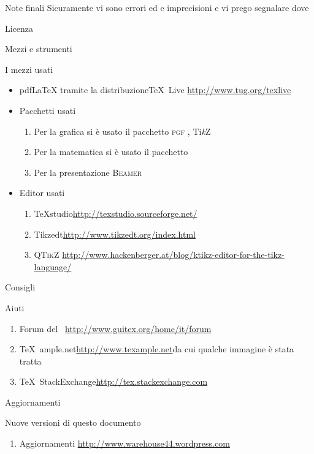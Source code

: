 \begin{frame}{Note finali}
	Sicuramente vi sono errori ed e imprecisioni e vi prego segnalare dove
	\begin{alertblock}{Licenza}
	
	\end{alertblock}
\end{frame}
\begin{frame}{Mezzi e strumenti}
	\begin{alertblock}{I mezzi usati}
		\begin{itemize}
			\item pdf\LaTeX{} tramite la distribuzione\TeX{}~Live\newline
			\url{http://www.tug.org/texlive}
			\item Pacchetti usati
			\begin{enumerate}
				\item Per la grafica si è usato il pacchetto \textsc{pgf} \pgfversion, Ti\emph{k}Z
				\item Per la matematica si è usato il pacchetto \AmS
				\item Per la presentazione \textsc{Beamer}
			\end{enumerate}
			\item Editor usati
			\begin{enumerate}
				\item \TeX{}studio\newline \url{http://texstudio.sourceforge.net/} %
				\item Tikzedt\newline \url{http://www.tikzedt.org/index.html} %
				\item \textsc{QTikZ}\newline
				\url{http://www.hackenberger.at/blog/ktikz-editor-for-the-tikz-language/}
			\end{enumerate}
		\end{itemize}
	\end{alertblock}
\end{frame}
\begin{frame}[allowframebreaks]{Consigli}
	\begin{alertblock}{Aiuti}
		\begin{enumerate}
			\item Forum del \guit\ \newline \url{http://www.guitex.org/home/it/forum}
			\item \TeX{}~ample.net\newline \url{http://www.texample.net}\newline da cui qualche immagine è stata tratta
			\item \TeX{}~StackExchange\newline \url{http://tex.stackexchange.com}
		\end{enumerate}
	\end{alertblock}
\end{frame}
\begin{frame}[allowframebreaks]{Aggiornamenti}
	\begin{alertblock}{Nuove versioni di questo documento}
		\begin{enumerate}
		\item Aggiornamenti
		\url{http://www.warehouse44.wordpress.com}
		\end{enumerate}
	\end{alertblock}
\end{frame}